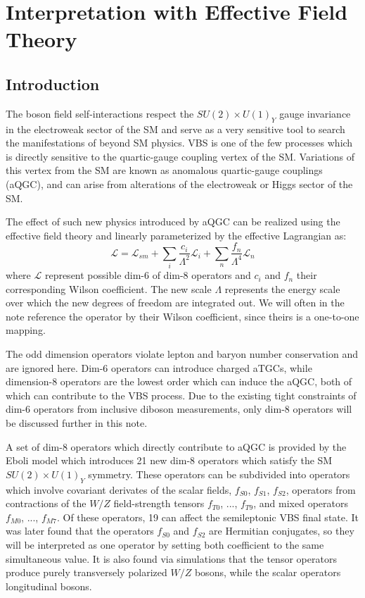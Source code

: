 \chapter{Interpretation with Effective Field Theory}
\section{Introduction}

The boson field self-interactions respect the $SU(2)\times U(1)_Y$ gauge invariance in the electroweak sector of the
SM and serve as a very sensitive tool to search the manifestations of beyond SM physics.
VBS is one of the few processes which is directly sensitive to the quartic-gauge coupling vertex of the SM.
Variations of this vertex from the SM are known as anomalous quartic-gauge couplings (aQGC), and can arise from alterations of the electroweak or Higgs sector of the SM.

The effect of such new physics introduced by aQGC can be realized using the effective field theory \cite{degrande2013effective} and linearly parameterized by the effective Lagrangian as:
\begin{equation*}
  \mathcal{L}=\mathcal{L}_{sm}+\sum_{i}\frac{c_i}{\Lambda^{2}}\mathcal{L}_i+\sum_{n}\frac{f_n}{\Lambda^{4}}\mathcal{L}_n
\end{equation*}
where $\mathcal{L}$ represent possible dim-6 of dim-8 operators and $c_i$ and $f_n$ their corresponding Wilson coefficient. The new scale $\Lambda$ represents the energy scale over which the new degrees of freedom are integrated out. We will often in the note reference the operator by their Wilson coefficient, since theirs is a one-to-one mapping.

The odd dimension operators violate lepton and baryon number conservation and are ignored here.
Dim-6 operators can introduce charged aTGCs, while dimension-8 operators are the lowest order which can induce the aQGC, both of which can contribute to the VBS process. 
Due to the existing tight constraints of dim-6 operators from inclusive diboson measurements, only dim-8 operators will be discussed further in this note.

A set of dim-8 operators which directly contribute to aQGC is provided by the Eboli model \cite{eboli2006p} which introduces 21 new dim-8 operators which satisfy the SM $SU(2)\times U(1)_Y$ symmetry. 
These operators can be subdivided into operators which involve covariant derivates of the scalar fields, $f_{S0}$, $f_{S1}$, $f_{S2}$, operators from contractions of the $W/Z$ field-strength tensors $f_{T0}$, ..., $f_{T9}$, and mixed operators $f_{M0}$, ..., $f_{M7}$. 
Of these operators, 19 can affect the semileptonic VBS final state.
It was later found that the operators $f_{S0}$ and $f_{S2}$ are Hermitian conjugates, so they will be interpreted as one operator by setting both coefficient to the same simultaneous value.
It is also found via simulations that the tensor operators produce purely transversely polarized $W/Z$ bosons, while the scalar operators longitudinal bosons.

